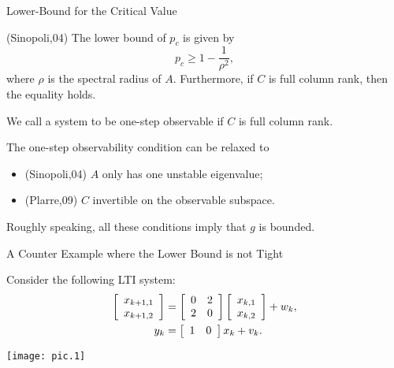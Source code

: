 \documentclass[10pt]{beamer}
\begin{document}
  \begin{frame}{Lower-Bound for the Critical Value}
    \begin{theorem}
      (Sinopoli,04) The lower bound of $p_c$ is given by
      \begin{displaymath}
	p_c \geq 1-\frac{1}{\rho^2}, 
      \end{displaymath}
      where $\rho$ is the spectral radius of $A$. Furthermore, if $C$ is full column rank, then the equality holds.
    \end{theorem}
    We call a system to be one-step observable if $C$ is full column rank.

    The one-step observability condition can be relaxed to
    \begin{itemize}
      \item (Sinopoli,04) $A$ only has one unstable eigenvalue;
      \item (Plarre,09) $C$ invertible on the observable subspace.
    \end{itemize}
    Roughly speaking, all these conditions imply that $g$ is bounded.
  \end{frame}

  \begin{frame}{A Counter Example where the Lower Bound is not Tight}

    Consider the following LTI system:
    \begin{displaymath}
      \begin{split}
       \left[ {\begin{array}{*{20}c}
	 x_{k+1,1}  \\
	 x_{k+1,2}
      \end{array}} \right] &=
\left[ {\begin{array}{*{20}c}
	0 & 2  \\
	2 & 0 
      \end{array}} \right]  \left[ {\begin{array}{*{20}c}
	 x_{k,1}  \\
	 x_{k,2}
      \end{array}} \right] + w_k,\\
      y_k &= \left[ {\begin{array}{*{20}c}
	1 & 0 
      \end{array}} \right] x_k + v_k.
      \end{split}
    \end{displaymath}
    \begin{center}
      \texttt{[image: pic.1]}
    \end{center}
  \end{frame}
\end{document}
